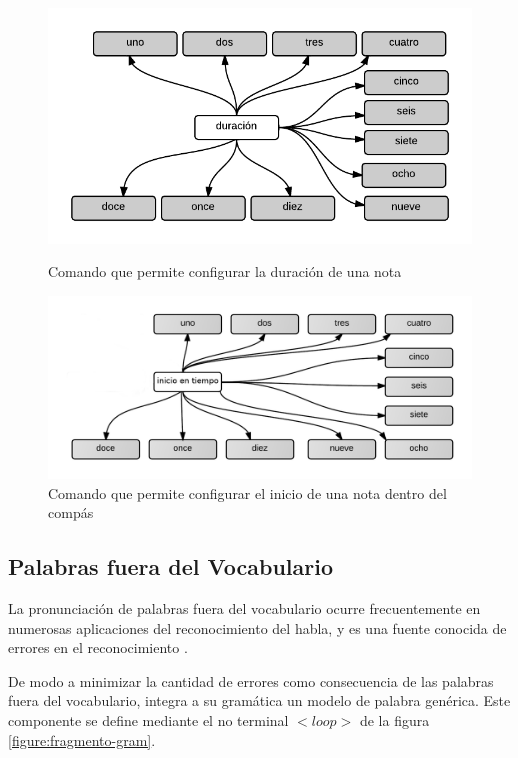 \begin{figure}[H]
\begin{minipage}[b]{0.5\linewidth}
\centering
\includegraphics[width=0.9\linewidth]{./graphics/cmd-dur.png}
\caption{Comando que permite configurar la duraci\'on de una nota}
\label{figure:cmd-dur}
\end{minipage}
\quad
\begin{minipage}[b]{0.5\linewidth}
\centering
\includegraphics[width=1.1\linewidth]{./graphics/cmd-note-tiempo.png}
\caption{Comando que permite configurar el inicio de una nota dentro del comp\'as}
\label{figure:cmd-note-tiempo}
\end{minipage}
\end{figure}

\subsection{Palabras fuera del Vocabulario}
\label{sec:oov}
La pronunciaci\'on de palabras fuera del vocabulario ocurre frecuentemente en numerosas aplicaciones
del reconocimiento del habla, y es una fuente conocida de errores en el reconocimiento \cite{Bazzi00Modeling}.

De modo a minimizar la cantidad de errores como consecuencia de las palabras fuera del vocabulario,
 integra a su gram\'atica un modelo de palabra gen\'erica. Este componente se
define mediante el no terminal $<loop>$ de la figura \ref{figure:fragmento-gram}.

